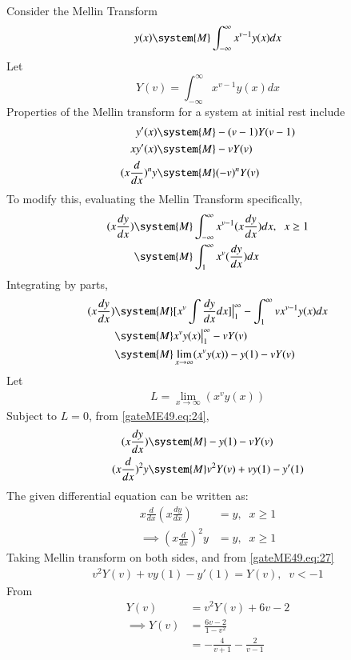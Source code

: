 \documentclass[journal,12pt,twocolumn]{IEEEtran}
\theoremstyle{remark}
\begin{document}
Consider the Mellin Transform
\begin{align}
    y(x)\system{M}\int_{-\infty}^{\infty} x^{v-1}y(x){dx} 
\end{align}
 Let $$Y(v)=\int_{-\infty}^{\infty} x^{v-1}y(x){dx} $$ 
 Properties of the Mellin transform for a system at initial rest include 
\begin{align}
    y'(x) &\system{M} -(v-1)Y(v-1)\\
    xy'(x) &\system{M} -v Y(v)\\
    (x\frac{d}{dx})^ny&\system{M} (-v)^nY(v) 
\end{align}
To modify this, evaluating the Mellin Transform specifically,
\begin{align}
    (x\frac{dy}{dx}) &\system{M} \int_{-\infty}^{\infty} x^{v-1}(x\frac{dy}{dx}){dx}, \;\;x\geq1\\ 
    &\system{M} \int_{1}^{\infty} x^{v}(\frac{dy}{dx}){dx}
\end{align} 
Integrating by parts, 
\begin{align}
    (x\frac{dy}{dx}) &\system{M} [x^v\int \frac{dy}{dx}dx ]\big{|}_1 ^{\infty}-\int_1^{\infty} vx^{v-1}y(x)dx\\
    &\system{M} x^vy(x)\big{|}_1^{\infty} -vY(v)\\
    &\system{M} \lim_{x\rightarrow{\infty}} (x^v y(x))-y(1)-vY(v)
\end{align} 
Let \begin{align} L=\lim_{x\rightarrow{\infty}} (x^v y(x)) \label{gateME49.eq: 10}\end{align}
Subject to $L=0$, from \eqref{gateME49.eq:24}, 
\begin{align}
    (x\frac{dy}{dx}) &\system{M} -y(1)-vY(v)\\
    (x\frac{d}{dx})^2 y &\system {M} v^2Y(v)+vy(1)-y'(1)
\end{align}
The given differential equation can be written as: 
\begin{align}
    x\frac{d}{dx}(x\frac{dy}{dx})&=y,\;\;x\geq 1\\
    \implies (x\frac{d}{dx})^2y&=y,\;\;x\geq 1
\end{align}
Taking Mellin transform on both sides, and from \eqref{gateME49.eq:27} 
\begin{align}
    v^2Y(v)+vy(1)-y'(1)=Y(v),\;\;v<-1
\end{align}
From 
\begin{align}
    Y(v)&=v^2Y(v)+6v-2\\
    \implies Y(v)&= \frac{6v-2}{1-v^2}\\&=-\frac{4}{v+1}-\frac{2}{v-1}
\end{align}
\end{document}
